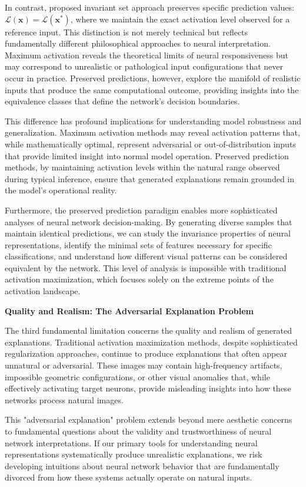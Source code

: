 \documentclass[licencjacka,en]{pracamgr}
\begin{document}
In contrast, proposed invariant set approach preserves specific prediction values: $\mathcal{L}(\mathbf{x}) = \mathcal{L}(\mathbf{x^*})$, where we maintain the exact activation level observed for a reference input. This distinction is not merely technical but reflects fundamentally different philosophical approaches to neural interpretation. Maximum activation reveals the theoretical limits of neural responsiveness but may correspond to unrealistic or pathological input configurations that never occur in practice. Preserved predictions, however, explore the manifold of realistic inputs that produce the same computational outcome, providing insights into the equivalence classes that define the network's decision boundaries.

This difference has profound implications for understanding model robustness and generalization. Maximum activation methods may reveal activation patterns that, while mathematically optimal, represent adversarial or out-of-distribution inputs that provide limited insight into normal model operation. Preserved prediction methods, by maintaining activation levels within the natural range observed during typical inference, ensure that generated explanations remain grounded in the model's operational reality.

Furthermore, the preserved prediction paradigm enables more sophisticated analyses of neural network decision-making. By generating diverse samples that maintain identical predictions, we can study the invariance properties of neural representations, identify the minimal sets of features necessary for specific classifications, and understand how different visual patterns can be considered equivalent by the network. This level of analysis is impossible with traditional activation maximization, which focuses solely on the extreme points of the activation landscape.

\textbf{Quality and Realism: The Adversarial Explanation Problem}

The third fundamental limitation concerns the quality and realism of generated explanations. Traditional activation maximization methods, despite sophisticated regularization approaches, continue to produce explanations that often appear unnatural or adversarial. These images may contain high-frequency artifacts, impossible geometric configurations, or other visual anomalies that, while effectively activating target neurons, provide misleading insights into how these networks process natural images.

This "adversarial explanation" problem extends beyond mere aesthetic concerns to fundamental questions about the validity and trustworthiness of neural network interpretations. If our primary tools for understanding neural representations systematically produce unrealistic explanations, we risk developing intuitions about neural network behavior that are fundamentally divorced from how these systems actually operate on natural inputs.
\end{document}

